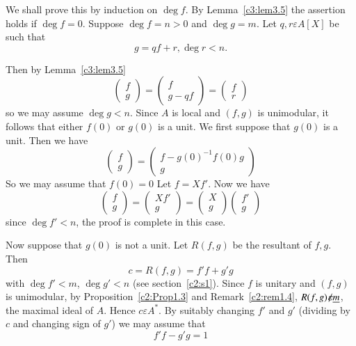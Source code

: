 \begin{Proof}
We shall prove this by induction on $\deg f$. By Lemma~\ref{c3:lem3.5}
the assertion holds if $\deg f=0$. Suppose $\deg f=n>0$ and $\deg
g=m$. Let $q,r\varepsilon A[X]$ be such that 
$$
g=qf+r, \deg r<n.
$$

Then by Lemma~\ref{c3:lem3.5}
$$
\begin{pmatrix}
f\\
g
\end{pmatrix} = \begin{pmatrix}
f\\
g-qf
\end{pmatrix} = \begin{pmatrix}
f\\ 
r
\end{pmatrix}
$$
so we may assume $\deg g<n$. Since $A$ is local and $(f,g)$ is
unimodular, it follows that either $f(0)$ or $g(0)$ is a unit. We
first suppose that $g(0)$ is a unit. Then we have 
$$
\begin{pmatrix}
f\\
g
\end{pmatrix} = \begin{pmatrix}
f-g(0)^{-1}f(0)g\\
g
\end{pmatrix}
$$
So we may assume that $f(0)=0$ Let $f=Xf'$. Now we have 
$$
\begin{pmatrix}
f\\
g
\end{pmatrix} = \begin{pmatrix}
Xf'\\
g
\end{pmatrix} = \begin{pmatrix}
X\\
g
\end{pmatrix} \begin{pmatrix}
f'\\
g
\end{pmatrix}
$$
since $\deg f'<n$, the proof is complete in this case. 

Now suppose that $g(0)$ is not a unit. Let $R(f,g)$ be the resultant
of $f,g$. Then 
$$
c=R(f,g)=f'f+g'g
$$
with $\deg f'<m$, $\deg g' <n$ (see section~\ref{c2:s1}). Since $f$ is
unitary and $(f,g)$ is unimodular, by Proposition~\ref{c2:Prop1.3} and
Remark~\ref{c2:rem1.4}, $R(f,g){\not\kern-2pt\varepsilon} \underline{m}$, the maximal ideal
of $A$. Hence $c\varepsilon A^{\ast}$. By suitably changing $f'$ and
$g'$ (dividing by $c$ and changing sign of $g'$) we may assume that 
$$
f'f-g'g=1
$$


\end{Proof}
